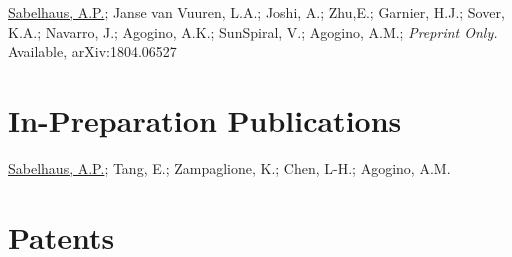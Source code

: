 \documentclass[letterpaper]{deedy-resume} %
\begin{document}
{\begin{etaremune}
\item {} \underline{Sabelhaus, A.P.}; Janse van Vuuren, L.A.; Joshi, A.; Zhu,E.; Garnier, H.J.; Sover, K.A.; Navarro, J.; Agogino, A.K.; SunSpiral, V.; Agogino, A.M.; {\it Preprint Only.} Available, arXiv:1804.06527 

\end{etaremune}  

  
\section{In-Preparation Publications}

\vspace{0.2cm}

\begin{etaremune}



\item {} \underline{Sabelhaus, A.P.}; Tang, E.; Zampaglione, K.; Chen, L-H.; Agogino, A.M.
  


\end{etaremune}


\section{Patents}

\vspace{0.2cm}

\begin{etaremune}


\end{etaremune}}
\end{document}
